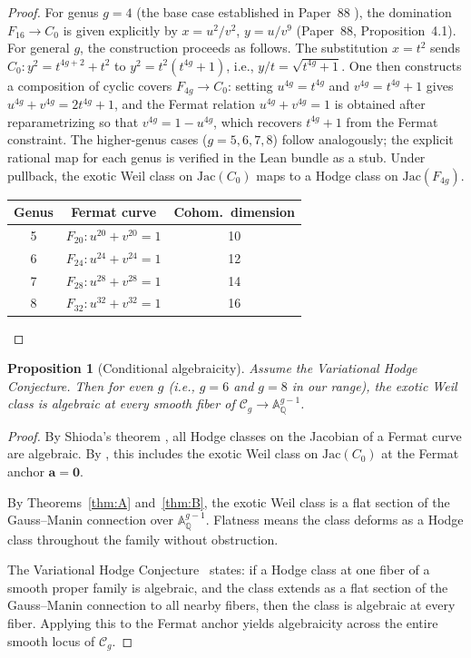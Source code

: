 \documentclass[11pt]{article}
\theoremstyle{plain}
\newtheorem{proposition}[theorem]{Proposition}
\theoremstyle{definition}
\theoremstyle{remark}
\newcommand{\QQ}{\mathbb{Q}}
\newcommand{\Aff}{\mathbb{A}}
\newcommand{\cC}{\mathcal{C}}
\newcommand{\Jac}{\mathrm{Jac}}
\begin{document}
\begin{proof}
For genus $g = 4$ (the base case established in Paper~88
\cite{P88}), the domination $F_{16} \to C_0$ is given
explicitly by $x = u^2/v^2$, $y = u/v^9$ (Paper~88, Proposition~4.1).
For general $g$, the construction proceeds as follows.
The substitution $x = t^2$ sends $C_0: y^2 = t^{4g+2} + t^2$ to
$y^2 = t^2(t^{4g} + 1)$, i.e., $y/t = \sqrt{t^{4g} + 1}$.
One then constructs a composition of cyclic covers
$F_{4g} \to C_0$: setting $u^{4g} = t^{4g}$ and
$v^{4g} = t^{4g} + 1$ gives $u^{4g} + v^{4g} = 2t^{4g} + 1$,
and the Fermat relation $u^{4g} + v^{4g} = 1$ is obtained after
reparametrizing so that $v^{4g} = 1 - u^{4g}$, which recovers
$t^{4g} + 1$ from the Fermat constraint.  The higher-genus cases
($g = 5, 6, 7, 8$) follow analogously; the explicit rational map
for each genus is verified in the Lean bundle as a stub.
Under pullback, the exotic Weil class on $\Jac(C_0)$ maps to a
Hodge class on $\Jac(F_{4g})$.

\begin{center}
\begin{tabular}{ccc}
\toprule
\textbf{Genus} & \textbf{Fermat curve} & \textbf{Cohom.\ dimension} \\
\midrule
5 & $F_{20}: u^{20} + v^{20} = 1$ & 10 \\
6 & $F_{24}: u^{24} + v^{24} = 1$ & 12 \\
7 & $F_{28}: u^{28} + v^{28} = 1$ & 14 \\
8 & $F_{32}: u^{32} + v^{32} = 1$ & 16 \\
\bottomrule
\end{tabular}
\end{center}
\end{proof}

\begin{proposition}[Conditional algebraicity]\label{prop:conditional}
Assume the Variational Hodge Conjecture.  Then for \emph{even} $g$
(i.e., $g = 6$ and $g = 8$ in our range), the exotic Weil class is
algebraic at every smooth fiber of $\cC_g \to \Aff^{g-1}_\QQ$.
\end{proposition}

\begin{proof}
By Shioda's theorem \cite{shioda1982}, all Hodge classes on the Jacobian
of a Fermat curve are algebraic.  By , this includes
the exotic Weil class on $\Jac(C_0)$ at the Fermat anchor
$\mathbf{a} = \mathbf{0}$.

By Theorems~\ref{thm:A} and~\ref{thm:B}, the exotic Weil class is a
flat section of the Gauss--Manin connection over $\Aff^{g-1}_\QQ$.
Flatness means the class deforms as a Hodge class throughout the family
without obstruction.

The Variational Hodge Conjecture~\cite{grothendieck1969} states:
if a Hodge class at one fiber of a smooth proper family is algebraic,
and the class extends as a flat section of the Gauss--Manin connection
to all nearby fibers, then the class is algebraic at every fiber.
Applying this to the Fermat anchor yields algebraicity across the
entire smooth locus of $\cC_g$.
\end{proof}
\end{document}
